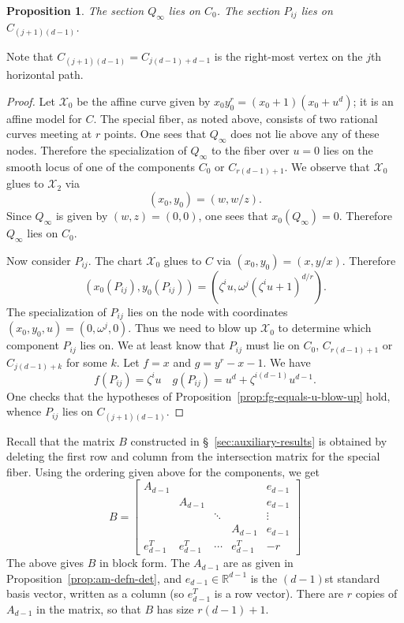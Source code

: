 \documentclass[pagesize,paper=letter]{scrartcl}
\newtheorem{proposition}[thm]{Proposition}
\theoremstyle{definition}
\theoremstyle{remark}
\def\R{\mathbb{R}}
\def\sX{\mathcal{X}}
\begin{document}
\begin{proposition}
  The section $Q_\infty$ lies on $C_0$. The section $P_{ij}$ lies on $C_{(j+1)(d-1)}$.
\end{proposition}

Note that $C_{(j+1)(d-1)} = C_{j(d-1) + d-1}$ is the right-most vertex on the $j$th horizontal path.

\begin{proof}
  Let $\sX_0$ be the affine curve given by $x_0 y_0^r = (x_0+1)(x_0+u^d)$; it is an affine model for $C$. The special fiber, as noted above, consists of two rational curves meeting at $r$ points. One sees that $Q_\infty$ does not lie above any of these nodes. Therefore the specialization of $Q_\infty$ to the fiber over $u = 0$ lies on the smooth locus of one of the components $C_0$ or $C_{r(d-1)+1}$. We observe that $\sX_0$ glues to $\sX_2$ via
  \[
  (x_0, y_0) = (w, w/z).
  \]
  Since $Q_\infty$ is given by $(w, z) = (0, 0)$, one sees that $x_0(Q_\infty) = 0$. Therefore $Q_\infty$ lies on $C_0$.

  Now consider $P_{ij}$. The chart $\sX_0$ glues to $C$ via $(x_0, y_0) = (x, y/x)$. Therefore
  \[
  (x_0(P_{ij}), y_0(P_{ij})) = (\zeta^i u, \omega^j(\zeta^iu + 1)^{d/r}).
  \]
  The specialization of $P_{ij}$ lies on the node with coordinates $(x_0, y_0, u) = (0, \omega^j, 0)$. Thus we need to blow up $\sX_0$ to determine which component $P_{ij}$ lies on. We at least know that $P_{ij}$ must lie on $C_0$, $C_{r(d-1)+1}$ or $C_{j(d-1) + k}$ for some $k$. Let $f = x$ and $g = y^r - x - 1$. We have
  \[
  f(P_{ij}) = \zeta^i u \quad g(P_{ij}) = u^d + \zeta^{i(d-1)} u^{d-1}.
  \]
  One checks that the hypotheses of Proposition~\ref{prop:fg-equals-u-blow-up} hold, whence $P_{ij}$ lies on $C_{(j+1)(d-1)}$.
\end{proof}

Recall that the matrix $B$ constructed in \S~\ref{sec:auxiliary-results} is obtained by deleting the first row and column from the intersection matrix for the special fiber. Using the ordering given above for the components, we get
\[
B =
\left[\begin{array}{ccccc}
  A_{d-1} & & & & e_{d-1} \\
  & A_{d-1} & & & e_{d-1} \\
  & & \ddots & & \vdots \\
  & & & A_{d-1} & e_{d-1} \\
  e_{d-1}^T & e_{d-1}^T & \cdots & e_{d-1}^T & -r
\end{array}\right]
\]
The above gives $B$ in block form. The $A_{d-1}$ are as given in Proposition~\ref{prop:am-defn-det}, and $e_{d-1} \in \R^{d-1}$ is the $(d-1)$st standard basis vector, written as a column (so $e_{d-1}^T$ is a row vector). There are $r$ copies of $A_{d-1}$ in the matrix, so that $B$ has size $r(d-1) + 1$.
\end{document}
